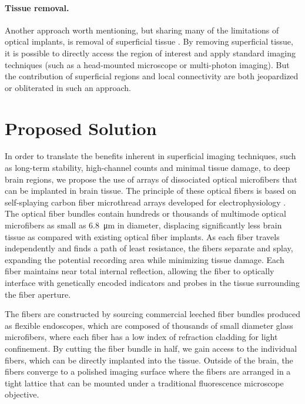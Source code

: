 \paragraph{Tissue removal.} Another approach worth mentioning, 
but sharing many of the limitations of optical implants, is 
removal of superficial tissue \cite{Dombeck:2010jr}. By 
removing superficial tissue, it is possible to directly access 
the region of interest and apply standard imaging techniques 
(such as a head-mounted microscope or multi-photon imaging). 
But the contribution of superficial regions and local connectivity 
are both jeopardized or obliterated in such an approach.

\section{Proposed Solution}

In order to translate the benefits inherent in superficial 
imaging techniques, such as long-term stability, high-channel 
counts and minimal tissue damage, to deep brain regions, we 
propose the use of arrays of dissociated optical microfibers 
that can be implanted in brain tissue. The principle of these 
optical fibers is based on self-splaying carbon fiber microthread 
arrays developed for electrophysiology 
\cite{Guitchounts:2013bs,Markowitz:2015ko}. The optical fiber 
bundles contain hundreds or thousands of multimode 
optical microfibers as small as 6.8~\si{\micro\meter} in diameter, 
displacing significantly less brain tissue as 
compared with existing optical fiber implants. As each 
fiber travels independently and finds a path of least 
resistance, the fibers separate and splay, expanding 
the potential recording area while minimizing tissue 
damage. Each fiber maintains near total internal reflection, 
allowing the fiber to optically interface with genetically 
encoded indicators and probes in the tissue surrounding the 
fiber aperture.

The fibers are constructed by sourcing commercial leeched 
fiber bundles produced as flexible endoscopes, which are 
composed of thousands of small diameter glass microfibers, 
where each fiber has a low index of refraction cladding for 
light confinement. By cutting the fiber bundle in half, we 
gain access to the individual fibers, which can be directly 
implanted into the tissue. Outside of the brain, the fibers 
converge to a polished imaging surface where the fibers are 
arranged in a tight lattice that can be mounted under a 
traditional fluorescence microscope objective.

